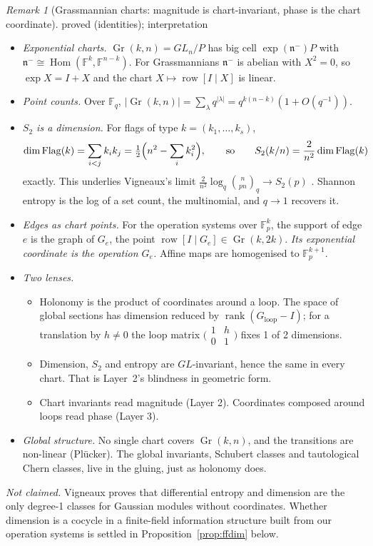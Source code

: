 \documentclass[11pt]{article}
\theoremstyle{definition}
\theoremstyle{remark}
\newtheorem{remark}[theorem]{Remark}
\newcommand{\F}{\mathbb{F}}
\newcommand{\st}[1]{\textsf{\small\color{gray}#1}}
\begin{document}
\begin{remark}[Grassmannian charts: magnitude is chart-invariant, phase is the chart coordinate]\label{rem:grass}\st{proved (identities); interpretation}
\begin{itemize}
  \item \emph{Exponential charts.} $\operatorname{Gr}(k,n)=GL_n/P$ has big cell $\exp(\mathfrak n^-)P$ with $\mathfrak n^-\cong\operatorname{Hom}(\F^k,\F^{n-k})$. For Grassmannians $\mathfrak n^-$ is abelian with $X^2=0$, so $\exp X=I+X$ and the chart $X\mapsto\operatorname{row}[I\mid X]$ is linear.
  \item \emph{Point counts.} Over $\F_q$, $|\operatorname{Gr}(k,n)|=\sum_\lambda q^{|\lambda|}=q^{k(n-k)}(1+O(q^{-1}))$.
  \item \emph{$S_2$ is a dimension.} For flags of type $k=(k_1,\dots,k_s)$,
  \[
  \dim\operatorname{Flag}(k)=\sum_{i<j}k_ik_j=\tfrac12\Bigl(n^2-\sum_ik_i^2\Bigr),\qquad\text{so}\qquad S_2(k/n)=\frac{2}{n^2}\dim\operatorname{Flag}(k)
  \]
  exactly. This underlies Vigneaux's limit $\tfrac{2}{n^2}\log_q\binom{n}{pn}_q\to S_2(p)$ \cite{vig}. Shannon entropy is the log of a set count, the multinomial, and $q\to1$ recovers it.
  \item \emph{Edges as chart points.} For the operation systems over $\F_p^k$, the support of edge $e$ is the graph of $G_e$, the point $\operatorname{row}[I\mid G_e]\in\operatorname{Gr}(k,2k)$. \emph{Its exponential coordinate is the operation $G_e$.} Affine maps are homogenised to $\F_p^{k+1}$.
  \item \emph{Two lenses.}
  \begin{itemize}
    \item Holonomy is the product of coordinates around a loop. The space of global sections has dimension reduced by $\operatorname{rank}(G_{\text{loop}}-I)$; for a translation by $h\neq0$ the loop matrix $\bigl(\begin{smallmatrix}1&h\\0&1\end{smallmatrix}\bigr)$ fixes 1 of 2 dimensions.
    \item Dimension, $S_2$ and entropy are $GL$-invariant, hence the same in every chart. That is Layer~2's blindness in geometric form.
    \item Chart invariants read magnitude (Layer 2). Coordinates composed around loops read phase (Layer 3).
  \end{itemize}
  \item \emph{Global structure.} No single chart covers $\operatorname{Gr}(k,n)$, and the transitions are non-linear (Pl\"ucker). The global invariants, Schubert classes and tautological Chern classes, live in the gluing, just as holonomy does.
\end{itemize}
\emph{Not claimed.} Vigneaux proves that differential entropy and dimension are the only degree-1 classes for Gaussian modules without coordinates. Whether dimension is a cocycle in a finite-field information structure built from our operation systems is settled in Proposition~\ref{prop:ffdim} below.
\end{remark}
\end{document}
